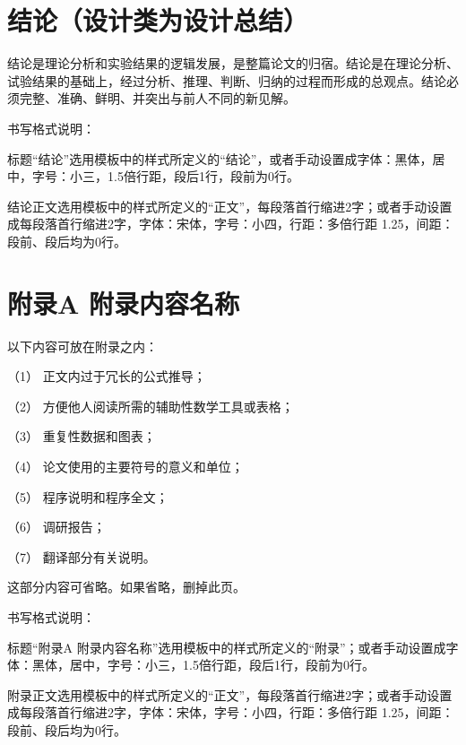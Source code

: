 \documentclass[UTF8,a4paper]{ctexart}
\numberwithin{table}{section}
\numberwithin{equation}{section}
\begin{document}
	\section*{\fontsize{15}{22.5} {\heiti 结\quad\quad 论（设计类为设计总结）}}
	结论是理论分析和实验结果的逻辑发展，是整篇论文的归宿。结论是在理论分析、试验结果的基础上，经过分析、推理、判断、归纳的过程而形成的总观点。结论必须完整、准确、鲜明、并突出与前人不同的新见解。\par 
	书写格式说明：\par 
	标题“结论”选用模板中的样式所定义的“结论”，或者手动设置成字体：黑体，居中，字号：小三，1.5倍行距，段后1行，段前为0行。\par
	结论正文选用模板中的样式所定义的“正文”，每段落首行缩进2字；或者手动设置成每段落首行缩进2字，字体：宋体，字号：小四，行距：多倍行距 1.25，间距：段前、段后均为0行。\par 
	\newpage
	\renewcommand{\refname}{\fontsize{15}{22.5} \bf{\heiti 参\ 考\ 文\ 献}}
	
	
	\newpage
	\section*{\fontsize{15}{22.5} {\heiti 附录A \quad 附录内容名称}}
	以下内容可放在附录之内：\par 
	（1） 正文内过于冗长的公式推导；\par 
	（2） 方便他人阅读所需的辅助性数学工具或表格；\par 
	（3） 重复性数据和图表；\par 
	（4） 论文使用的主要符号的意义和单位；\par 
	（5） 程序说明和程序全文；\par 
	（6） 调研报告；\par 
	（7） 翻译部分有关说明。\par 
	这部分内容可省略。如果省略，删掉此页。\par 
	书写格式说明：\par 
	标题“附录A 附录内容名称”选用模板中的样式所定义的“附录”；或者手动设置成字体：黑体，居中，字号：小三，1.5倍行距，段后1行，段前为0行。\par 
	附录正文选用模板中的样式所定义的“正文”，每段落首行缩进2字；或者手动设置成每段落首行缩进2字，字体：宋体，字号：小四，行距：多倍行距 1.25，间距：段前、段后均为0行。
	
\end{document}
